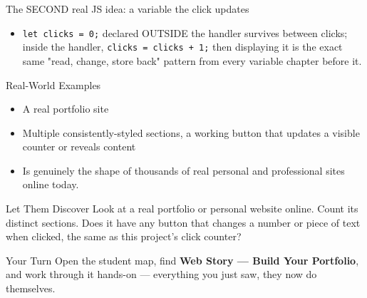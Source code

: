 \documentclass[aspectratio=169]{beamer}
\begin{document}
\begin{frame}{The SECOND real JS idea: a variable the click updates}
    \large
    \begin{itemize}
        \item \texttt{let clicks = 0;} declared OUTSIDE the handler survives between clicks; inside the handler, \texttt{clicks = clicks + 1;} then displaying it is the exact same "read, change, store back" pattern from every variable chapter before it.
    \end{itemize}
\end{frame}

\begin{frame}{Real-World Examples}
    \large
    \begin{itemize}
        \item A real portfolio site
        \item Multiple consistently-styled sections, a working button that updates a visible counter or reveals content
        \item Is genuinely the shape of thousands of real personal and professional sites online today.
    \end{itemize}
\end{frame}


\begin{frame}{Let Them Discover}
    \Large
    Look at a real portfolio or personal website online. Count its distinct sections. Does it have any button that changes a number or piece of text when clicked, the same as this project's click counter?
\end{frame}

\begin{frame}{Your Turn}
    \Large
    Open the student map, find \textbf{Web Story — Build Your Portfolio}, and work through it
    hands-on --- everything you just saw, they now do themselves.
\end{frame}
\end{document}
